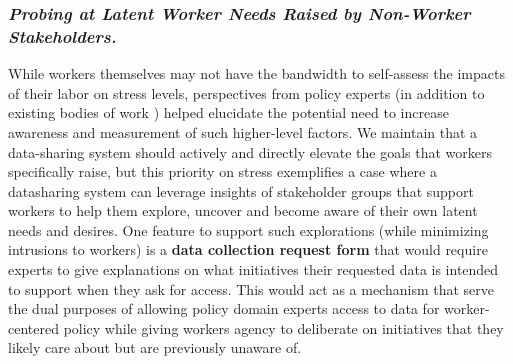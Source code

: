 \subsubsection{{\textbf{\textit{Probing at Latent Worker Needs Raised by Non-Worker Stakeholders.}}}}
{While workers themselves may not have the bandwidth to self-assess the impacts of their labor on stress levels, perspectives from policy experts (in addition to existing bodies of work \cite{gkI5, bSah}) helped elucidate the potential need to increase awareness and measurement of such higher-level factors.
%
%
We maintain that a data-sharing system should actively and directly elevate the goals that workers specifically raise, but this priority on stress exemplifies a case where a datasharing system can leverage insights of stakeholder groups that support workers to help them explore, uncover and become aware of their own latent needs and desires.
One feature to support such explorations (while minimizing intrusions to workers) is a \textbf{data collection request form} that 
would require experts to give explanations on what initiatives their requested data is intended to support when they ask for access. This would act as a mechanism that serve the dual purposes of allowing policy domain experts access to data for worker-centered policy while giving workers agency to deliberate on initiatives that they likely care about but are previously unaware of.%
} %

